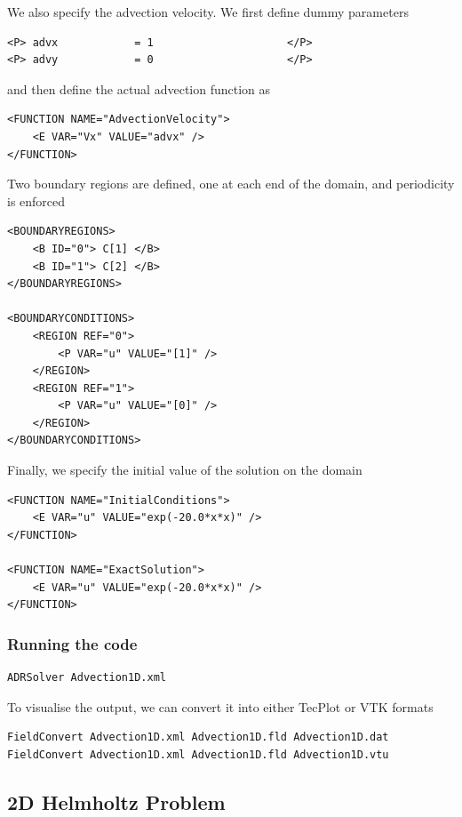 We also specify the advection velocity. We first define dummy parameters
\begin{lstlisting}[style=XMLStyle]
<P> advx            = 1                     </P>
<P> advy            = 0                     </P>
\end{lstlisting}
and then define the actual advection function as
\begin{lstlisting}[style=XMLStyle]
<FUNCTION NAME="AdvectionVelocity">
    <E VAR="Vx" VALUE="advx" />
</FUNCTION>
\end{lstlisting}

Two boundary regions are defined, one at each end of the domain, and periodicity
is enforced
\begin{lstlisting}[style=XMLStyle] 
<BOUNDARYREGIONS>
    <B ID="0"> C[1] </B>
    <B ID="1"> C[2] </B>
</BOUNDARYREGIONS>

<BOUNDARYCONDITIONS>
    <REGION REF="0">
        <P VAR="u" VALUE="[1]" />
    </REGION>
    <REGION REF="1">
        <P VAR="u" VALUE="[0]" />
    </REGION>
</BOUNDARYCONDITIONS>
\end{lstlisting}

Finally, we specify the initial value of the solution on the domain
\begin{lstlisting}[style=XMLStyle]
<FUNCTION NAME="InitialConditions">
    <E VAR="u" VALUE="exp(-20.0*x*x)" />
</FUNCTION>

<FUNCTION NAME="ExactSolution">
    <E VAR="u" VALUE="exp(-20.0*x*x)" />
</FUNCTION>
\end{lstlisting}

\subsubsection{Running the code}
\begin{lstlisting}[style=BashInputStyle]
ADRSolver Advection1D.xml
\end{lstlisting}

To visualise the output, we can convert it into either TecPlot or VTK formats
\begin{lstlisting}[style=BashInputStyle]
FieldConvert Advection1D.xml Advection1D.fld Advection1D.dat
FieldConvert Advection1D.xml Advection1D.fld Advection1D.vtu
\end{lstlisting}


\subsection{2D Helmholtz Problem}

